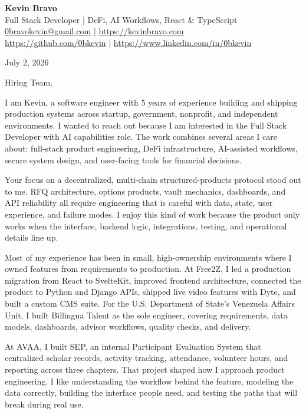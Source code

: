 \documentclass[11pt]{article}
\begin{document}
\raggedright

\begin{center}
    {\LARGE \textbf{Kevin Bravo}}\\
    Full Stack Developer | DeFi, AI Workflows, React \& TypeScript \\
    \href{mailto:0bravokevin@gmail.com}{0bravokevin@gmail.com} |
    \href{https://kevinbravo.com}{https://kevinbravo.com} \\
    \href{https://github.com/0bkevin}{https://github.com/0bkevin} |
    \href{https://www.linkedin.com/in/0bkevin/}{https://www.linkedin.com/in/0bkevin}
\end{center}

\vspace{0.45em}

July 2, 2026

Hiring Team,

I am Kevin, a software engineer with 5 years of experience building and shipping production systems across startup, government, nonprofit, and independent environments. I wanted to reach out because I am interested in the Full Stack Developer with AI capabilities role. The work combines several areas I care about: full-stack product engineering, DeFi infrastructure, AI-assisted workflows, secure system design, and user-facing tools for financial decisions.

Your focus on a decentralized, multi-chain structured-products protocol stood out to me. RFQ architecture, options products, vault mechanics, dashboards, and API reliability all require engineering that is careful with data, state, user experience, and failure modes. I enjoy this kind of work because the product only works when the interface, backend logic, integrations, testing, and operational details line up.

Most of my experience has been in small, high-ownership environments where I owned features from requirements to production. At Free2Z, I led a production migration from React to SvelteKit, improved frontend architecture, connected the product to Python and Django APIs, shipped live video features with Dyte, and built a custom CMS suite. For the U.S. Department of State's Venezuela Affairs Unit, I built Billingua Talent as the sole engineer, covering requirements, data models, dashboards, advisor workflows, quality checks, and delivery.

At AVAA, I built SEP, an internal Participant Evaluation System that centralized scholar records, activity tracking, attendance, volunteer hours, and reporting across three chapters. That project shaped how I approach product engineering. I like understanding the workflow behind the feature, modeling the data correctly, building the interface people need, and testing the paths that will break during real use.
\end{document}
